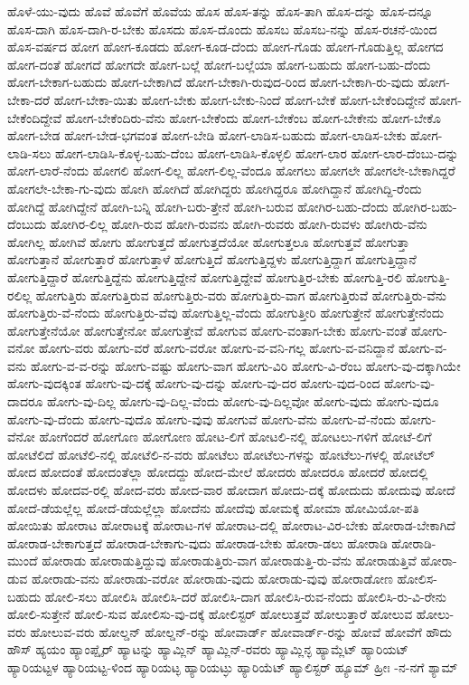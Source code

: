 {ಹೊಳೆ-ಯು-ವುದು
ಹೊವೆ
ಹೊವೆಗೆ
ಹೊವೆಯ
ಹೊಸ
ಹೊಸ-ತನ್ನು
ಹೊಸ-ತಾಗಿ
ಹೊಸ-ದನ್ನು
ಹೊಸ-ದನ್ನೂ
ಹೊಸ-ದಾಗಿ
ಹೊಸ-ದಾಗಿ-ರ-ಬೇಕು
ಹೊಸದು
ಹೊಸ-ದೊಂದು
ಹೊಸಬ
ಹೊಸಬ-ನನ್ನು
ಹೊಸ-ರಚನೆ-ಯಿಂದ
ಹೊಸ-ವರ್ಷದ
ಹೋಗ
ಹೋಗ-ಕೂಡದು
ಹೋಗ-ಕೂಡ-ದೆಂದು
ಹೋಗ-ಗೊಡು
ಹೋಗ-ಗೊಡುತ್ತಿಲ್ಲ
ಹೋಗದ
ಹೋಗ-ದಂತೆ
ಹೋಗದೆ
ಹೋಗದೇ
ಹೋಗ-ಬಲ್ಲೆ
ಹೋಗ-ಬಲ್ಲೆಯಾ
ಹೋಗ-ಬಹುದು
ಹೋಗ-ಬಹು-ದೆಂದು
ಹೋಗ-ಬೇಕಾಗ-ಬಹುದು
ಹೋಗ-ಬೇಕಾಗಿದೆ
ಹೋಗ-ಬೇಕಾಗಿ-ರುವುದ-ರಿಂದ
ಹೋಗ-ಬೇಕಾಗಿ-ರು-ವುದು
ಹೋಗ-ಬೇಕಾ-ದರೆ
ಹೋಗ-ಬೇಕಾ-ಯಿತು
ಹೋಗ-ಬೇಕು
ಹೋಗ-ಬೇಕು-ನಿಂದೆ
ಹೋಗ-ಬೇಕೆ
ಹೋಗ-ಬೇಕೆಂದಿದ್ದೇನೆ
ಹೋಗ-ಬೇಕೆಂದಿದ್ದೇವೆ
ಹೋಗ-ಬೇಕೆಂದಿರು-ವೆನು
ಹೋಗ-ಬೇಕೆಂದು
ಹೋಗ-ಬೇಕೆಂಬ
ಹೋಗ-ಬೇಕೇನು
ಹೋಗ-ಬೇಕೊ
ಹೋಗ-ಬೇಡ
ಹೋಗ-ಬೇಡ-ಭಗವಂತ
ಹೋಗ-ಬೇಡಿ
ಹೋಗ-ಲಾಡಿಸ-ಬಹುದು
ಹೋಗ-ಲಾಡಿಸ-ಬೇಕು
ಹೋಗ-ಲಾಡಿ-ಸಲು
ಹೋಗ-ಲಾಡಿಸಿ-ಕೊಳ್ಳ-ಬಹು-ದೆಂಬ
ಹೋಗ-ಲಾಡಿಸಿ-ಕೊಳ್ಳಲಿ
ಹೋಗ-ಲಾರ
ಹೋಗ-ಲಾರ-ದೆಂಬು-ದನ್ನು
ಹೋಗ-ಲಾರೆ-ನೆಂದು
ಹೋಗಲಿ
ಹೋಗ-ಲಿಲ್ಲ
ಹೋಗ-ಲಿಲ್ಲ-ವೆಂದೂ
ಹೋಗಲು
ಹೋಗಲೇ
ಹೋಗಲೇ-ಬೇಕಾಗಿದ್ದರೆ
ಹೋಗಲೇ-ಬೇಕಾ-ಗು-ವುದು
ಹೋಗಿ
ಹೋಗಿದೆ
ಹೋಗಿದ್ದರು
ಹೋಗಿದ್ದರೂ
ಹೋಗಿದ್ದಾನೆ
ಹೋಗಿದ್ದಿ-ರೆಂದು
ಹೋಗಿದ್ದೆ
ಹೋಗಿದ್ದೇನೆ
ಹೋಗಿ-ಬನ್ನಿ
ಹೋಗಿ-ಬರು-ತ್ತೇನೆ
ಹೋಗಿ-ಬರುವ
ಹೋಗಿರ-ಬಹು-ದೆಂದು
ಹೋಗಿರ-ಬಹು-ದೆಂಬುದು
ಹೋಗಿರ-ಲಿಲ್ಲ
ಹೋಗಿ-ರುವ
ಹೋಗಿ-ರುವನು
ಹೋಗಿ-ರುವರು
ಹೋಗಿ-ರುವಳು
ಹೋಗಿರು-ವೆನು
ಹೋಗಿಲ್ಲ
ಹೋಗಿವೆ
ಹೋಗು
ಹೋಗುತ್ತದೆ
ಹೋಗುತ್ತದೆಯೋ
ಹೋಗುತ್ತಲೂ
ಹೋಗುತ್ತವೆ
ಹೋಗುತ್ತಾ
ಹೋಗುತ್ತಾನೆ
ಹೋಗುತ್ತಾರೆ
ಹೋಗುತ್ತಾಳೆ
ಹೋಗುತ್ತಿದೆ
ಹೋಗುತ್ತಿದ್ದಳು
ಹೋಗುತ್ತಿದ್ದಾಗ
ಹೋಗುತ್ತಿದ್ದಾನೆ
ಹೋಗುತ್ತಿದ್ದಾರೆ
ಹೋಗುತ್ತಿದ್ದೆನು
ಹೋಗುತ್ತಿದ್ದೇನೆ
ಹೋಗುತ್ತಿದ್ದೇವೆ
ಹೋಗುತ್ತಿರ-ಬೇಕು
ಹೋಗುತ್ತಿ-ರಲಿ
ಹೋಗುತ್ತಿ-ರಲಿಲ್ಲ
ಹೋಗುತ್ತಿರು
ಹೋಗುತ್ತಿರುವ
ಹೋಗುತ್ತಿರು-ವರು
ಹೋಗುತ್ತಿರು-ವಾಗ
ಹೋಗುತ್ತಿರುವೆ
ಹೋಗುತ್ತಿರು-ವೆನು
ಹೋಗುತ್ತಿರು-ವೆ-ನೆಂದು
ಹೋಗುತ್ತಿರು-ವೆವು
ಹೋಗುತ್ತಿಲ್ಲ-ವೆಂದು
ಹೋಗುತ್ತೀರಿ
ಹೋಗುತ್ತೇನೆ
ಹೋಗುತ್ತೇನೆಂದು
ಹೋಗುತ್ತೇನೆಯೋ
ಹೋಗುತ್ತೇನೋ
ಹೋಗುತ್ತೇವೆ
ಹೋಗುವ
ಹೋಗು-ವಂತಾಗ-ಬೇಕು
ಹೋಗು-ವಂತೆ
ಹೋಗು-ವನೋ
ಹೋಗು-ವರು
ಹೋಗು-ವರೆ
ಹೋಗು-ವರೋ
ಹೋಗು-ವ-ವನಿ-ಗಲ್ಲ
ಹೋಗು-ವ-ವನಿದ್ದಾನೆ
ಹೋಗು-ವ-ವನು
ಹೋಗು-ವ-ವ-ರನ್ನು
ಹೋಗು-ವಷ್ಟು
ಹೋಗು-ವಾಗ
ಹೋಗು-ವಿರಿ
ಹೋಗು-ವಿ-ರೆಂಬ
ಹೋಗು-ವು-ದಕ್ಕಾಗಿಯೇ
ಹೋಗು-ವುದಕ್ಕಿಂತ
ಹೋಗು-ವು-ದಕ್ಕೆ
ಹೋಗು-ವು-ದನ್ನು
ಹೋಗು-ವು-ದರ
ಹೋಗು-ವುದ-ರಿಂದ
ಹೋಗು-ವು-ದಾದರೂ
ಹೋಗು-ವು-ದಿಲ್ಲ
ಹೋಗು-ವು-ದಿಲ್ಲ-ವೆಂದು
ಹೋಗು-ವು-ದಿಲ್ಲವೋ
ಹೋಗು-ವುದು
ಹೋಗು-ವುದೂ
ಹೋಗು-ವು-ದೆಂದು
ಹೋಗು-ವುದೊ
ಹೋಗು-ವುವು
ಹೋಗುವೆ
ಹೋಗು-ವೆನು
ಹೋಗು-ವೆ-ನೆಂದು
ಹೋಗು-ವೆನೋ
ಹೋಗೆಂದರೆ
ಹೋಗೊಣ
ಹೋಗೋಣ
ಹೋಟ-ಲಿಗೆ
ಹೋಟಲಿ-ನಲ್ಲಿ
ಹೋಟಲು-ಗಳಿಗೆ
ಹೋಟೆ-ಲಿಗೆ
ಹೋಟೆಲಿದೆ
ಹೋಟೆಲಿ-ನಲ್ಲಿ
ಹೋಟೆಲಿ-ನ-ವರು
ಹೋಟೆಲು
ಹೋಟೆಲು-ಗಳನ್ನು
ಹೋಟೆಲು-ಗಳಲ್ಲಿ
ಹೋಟೆಲ್
ಹೋದ
ಹೋದಂತೆ
ಹೋದಂತೆಲ್ಲಾ
ಹೋದದ್ದು
ಹೋದ-ಮೇಲೆ
ಹೋದರು
ಹೋದರೂ
ಹೋದರೆ
ಹೋದಲ್ಲಿ
ಹೋದಳು
ಹೋದವ-ರಲ್ಲಿ
ಹೋದ-ವರು
ಹೋದ-ವಾರ
ಹೋದಾಗ
ಹೋದು-ದಕ್ಕೆ
ಹೋದುದು
ಹೋದುವು
ಹೋದೆ
ಹೋದೆ-ಡೆಯಲ್ಲೆಲ್ಲ
ಹೋದೆ-ಡೆಯಲ್ಲೆಲ್ಲಾ
ಹೋದೆನು
ಹೋದೆವು
ಹೋಮಕ್ಕೆ
ಹೋಮಾ
ಹೋಮಿಯೋ-ಪತಿ
ಹೋಯಿತು
ಹೋರಾಟ
ಹೋರಾಟಕ್ಕೆ
ಹೋರಾಟ-ಗಳ
ಹೋರಾಟ-ದಲ್ಲಿ
ಹೋರಾಟ-ವಿರ-ಬೇಕು
ಹೋರಾಡ-ಬೇಕಾಗಿದೆ
ಹೋರಾಡ-ಬೇಕಾಗುತ್ತದೆ
ಹೋರಾಡ-ಬೇಕಾಗು-ವುದು
ಹೋರಾಡ-ಬೇಕು
ಹೋರಾ-ಡಲು
ಹೋರಾಡಿ
ಹೋರಾಡಿ-ಮುಂದೆ
ಹೋರಾಡು
ಹೋರಾಡುತ್ತಿದ್ದುವು
ಹೋರಾಡುತ್ತಿರು-ವಾಗ
ಹೋರಾಡುತ್ತಿ-ರು-ವೆನು
ಹೋರಾಡುತ್ತಿವೆ
ಹೋರಾ-ಡುವ
ಹೋರಾಡು-ವನು
ಹೋರಾಡು-ವರೋ
ಹೋರಾಡು-ವುದು
ಹೋರಾಡು-ವುವು
ಹೋರಾಡೋಣ
ಹೋಲಿಸ-ಬಹುದು
ಹೋಲಿ-ಸಲು
ಹೋಲಿಸಿ
ಹೋಲಿಸಿ-ದರೆ
ಹೋಲಿಸಿ-ದಾಗ
ಹೋಲಿಸಿ-ರುವ-ನೆಂದು
ಹೋಲಿಸಿ-ರು-ವಿ-ರೇನು
ಹೋಲಿ-ಸುತ್ತೇನೆ
ಹೋಲಿ-ಸುವ
ಹೋಲಿಸು-ವು-ದಕ್ಕೆ
ಹೋಲಿಸ್ಟರ್
ಹೋಲುತ್ತವೆ
ಹೋಲುತ್ತಾರೆ
ಹೋಲುವ
ಹೋಲು-ವರು
ಹೋಲುವ-ವರು
ಹೋಲ್ಡನ್
ಹೋಲ್ಡನ್-ರನ್ನು
ಹೋವಾರ್ಡ್
ಹೋವಾರ್ಡ್-ರನ್ನು
ಹೋವೆ
ಹೋವೆಗೆ
ಹೌದು
ಹೌಸ್
ಹ್ಯಯಂ
ಹ್ಯಾಂಪ್ಷೈರ್
ಹ್ಯಾಟನ್ನು
ಹ್ಯಾಮ್ಲಿನ್
ಹ್ಯಾಮ್ಲಿನ್-ರವರು
ಹ್ಯಾಮ್ಲಿನ್ಳ
ಹ್ಯಾಮ್ಲೆಟ್
ಹ್ಯಾರಿಯಟ್
ಹ್ಯಾರಿಯಟ್ಟಳ
ಹ್ಯಾರಿಯಟ್ಟ-ಳಿಂದ
ಹ್ಯಾರಿಯಟ್ಳ
ಹ್ಯಾರಿಯಟ್ಳು
ಹ್ಯಾರಿಯೆಟ್
ಹ್ಯಾಲಿಸ್ಟರ್
ಹ್ಯೂಮ್
ಹ್ರೀಃ
-ನ-ನಗೆ
ಶ್ಯಾಮ್
}
